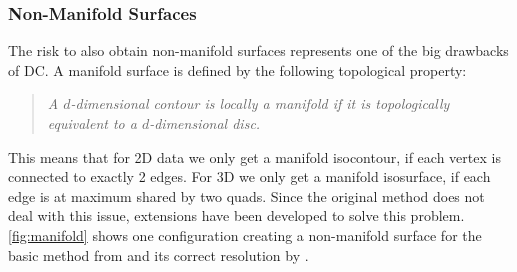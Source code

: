 \subsubsection{Non-Manifold Surfaces}
The risk to also obtain non-manifold surfaces represents one of the big drawbacks of \ac{DC}. A manifold surface is defined by the following topological property:
\begin{quote}
\emph{A $d$-dimensional contour is locally a \emph{manifold} if it is topologically equivalent to a $d$-dimensional disc.}\cite{Hermite2002}
\end{quote}
This means that for 2D data we only get a manifold isocontour, if each vertex is connected to exactly 2 edges. For 3D we only get a manifold isosurface, if each edge is at maximum shared by two \acp{quad}. Since the original method does not deal with this issue, extensions have been developed to solve this problem. \autoref{fig:manifold} shows one configuration creating a non-manifold surface for the basic method from \cite{Hermite2002} and its correct resolution by \cite{Schaefer2007}.

